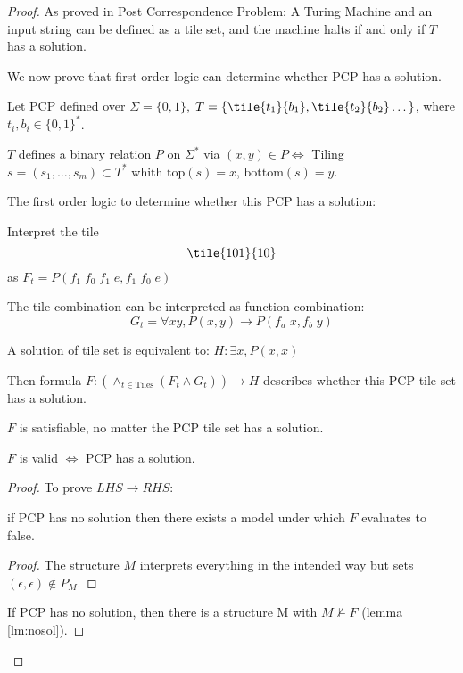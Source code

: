 \begin{proof}

As proved in Post Correspondence Problem: A Turing Machine and an input
string can be defined as a tile set, and the machine halts if and only if $T$ has a
solution.

We now prove that first order logic can determine whether PCP has a solution.

Let PCP defined over \(\Sigma = \{0,1\}\),
\(T = \{\tile{t_1}{b_1}, \tile{t_2}{b_2}\dots\}\), where
\(t_i, b_i \in \{0,1\}^*\).

\(T\) defines a binary relation \(P\) on \(\Sigma^*\) via \((x,y) \in P \Leftrightarrow\) Tiling \(s=(s_1,\dots,s_m) \subset T^*\)
whith \(\text{top}(s)=x\), \(\text{bottom}(s)=y\).

The first order logic to determine whether this PCP has a solution:

Interpret the tile
$$\tile{101}{10}$$
as \(F_t = P(f_1\;f_0\;f_1\;e, f_1\;f_0\;e)\)

The tile combination can be interpreted as function combination:
$$G_t = \forall xy, P(x,y) \rightarrow P(f_a\;x, f_b\;y)$$

A solution of tile set is equivalent to: \(H: \exists x, P(x,x)\)

Then formula
\(F: (\land_{t \in \text{Tiles}} (F_t \land G_t)) \rightarrow H\)
describes whether this PCP tile set has a solution.

\begin{observation}
\(F\) is satisfiable, no matter the PCP tile set has a solution.
\end{observation}

\begin{theorem}
$F$ is valid $\Leftrightarrow$ PCP has a solution.
\end{theorem}

\begin{proof}

To prove $LHS \rightarrow RHS$:

\begin{lemma}\label{lm:nosol}
if PCP has no solution then there exists a model under which
$F$ evaluates to false.
\end{lemma}

\begin{proof}
The structure $M$ interprets everything in the intended way but sets
\((\epsilon, \epsilon) \not \in P_M\). 
\end{proof}

If PCP has no solution, then there is a structure M with $M \not \models F$ (lemma \ref{lm:nosol}).


\end{proof}
\end{proof}
